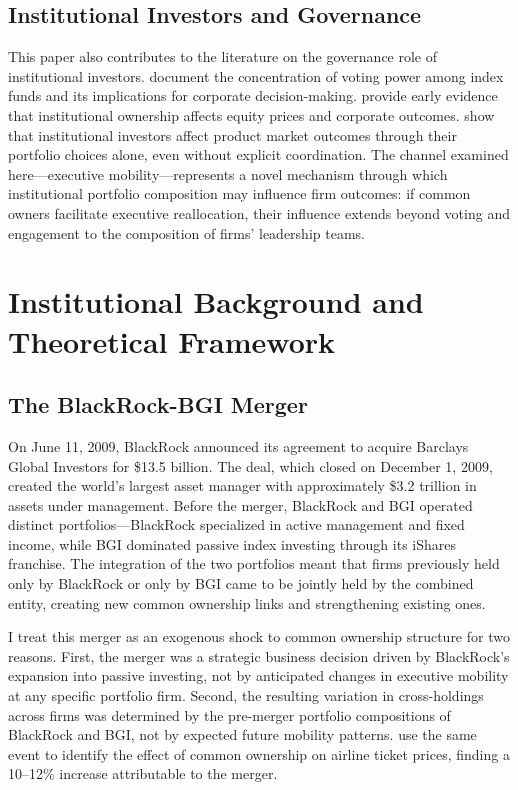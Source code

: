 \documentclass[11pt,a4paper]{article}
\begin{document}
\subsection{Institutional Investors and Governance}

This paper also contributes to the literature on the governance role of institutional investors. \cite{bebchuk2019} document the concentration of voting power among index funds and its implications for corporate decision-making. \cite{gompers2001} provide early evidence that institutional ownership affects equity prices and corporate outcomes. \cite{azar2018} show that institutional investors affect product market outcomes through their portfolio choices alone, even without explicit coordination. The channel examined here---executive mobility---represents a novel mechanism through which institutional portfolio composition may influence firm outcomes: if common owners facilitate executive reallocation, their influence extends beyond voting and engagement to the composition of firms' leadership teams.

\section{Institutional Background and Theoretical Framework}
\label{sec:background}

\subsection{The BlackRock-BGI Merger}

On June 11, 2009, BlackRock announced its agreement to acquire Barclays Global Investors for \$13.5 billion. The deal, which closed on December 1, 2009, created the world's largest asset manager with approximately \$3.2 trillion in assets under management. Before the merger, BlackRock and BGI operated distinct portfolios---BlackRock specialized in active management and fixed income, while BGI dominated passive index investing through its iShares franchise. The integration of the two portfolios meant that firms previously held only by BlackRock or only by BGI came to be jointly held by the combined entity, creating new common ownership links and strengthening existing ones.

I treat this merger as an exogenous shock to common ownership structure for two reasons. First, the merger was a strategic business decision driven by BlackRock's expansion into passive investing, not by anticipated changes in executive mobility at any specific portfolio firm. Second, the resulting variation in cross-holdings across firms was determined by the pre-merger portfolio compositions of BlackRock and BGI, not by expected future mobility patterns. \cite{azar2018} use the same event to identify the effect of common ownership on airline ticket prices, finding a 10--12\% increase attributable to the merger.
\end{document}
